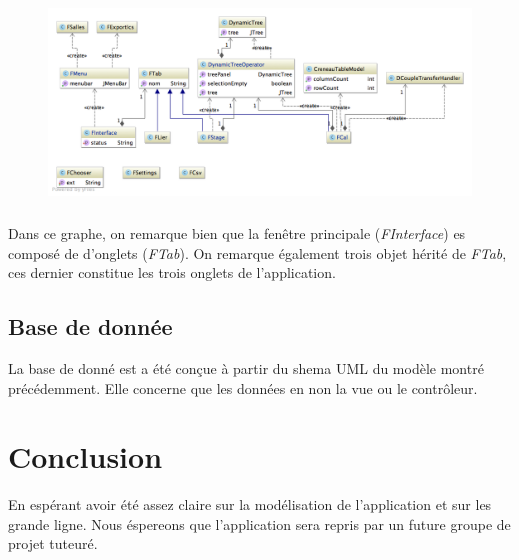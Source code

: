 \documentclass[a4paper,10pt]{report}
\begin{document}
			\begin{figure}[h!]
				\includegraphics[scale=.5]{uml_fen.png}
				\centering
			\end{figure}

			\paragraph*{}
			Dans ce graphe, on remarque bien que la fenêtre principale (\textit{FInterface}) es composé de d’onglets (\textit{FTab}). On remarque également trois objet hérité de \textit{FTab}, ces dernier constitue les trois onglets de l'application.

	\section{Base de donnée}

		La base de donné est a été conçue à partir du shema UML du modèle montré précédemment. Elle concerne que les données en non la vue ou le contrôleur.

\chapter*{Conclusion}

En espérant avoir été assez claire sur la modélisation de l'application et sur les grande ligne. Nous éspereons que l'application sera repris par un future groupe de projet tuteuré.
\end{document}
